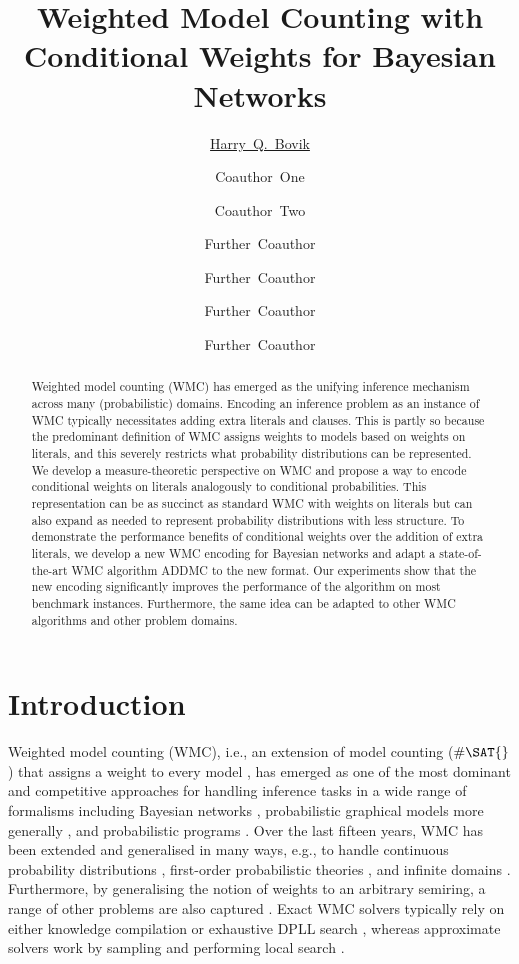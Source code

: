 \documentclass{uai2021} %
\title{Weighted Model Counting with Conditional Weights for Bayesian Networks}
\author[1]{\href{mailto:Harry Q. Bovik <harryq@example.edu>?Subject=Your UAI 2021 paper}{Harry~Q.~Bovik}{}} %
\author[2]{Coauthor~One}
\author[1,2]{Coauthor~Two}
\author[3]{Further~Coauthor}
\author[1]{Further~Coauthor}
\author[3]{Further~Coauthor}
\author[3,1]{Further~Coauthor}
\affil[1]{%
    Computer Science Dept.\\
    Cranberry University\\
    Pittsburgh, Pennsylvania, USA
}
\affil[2]{%
    Affiliation\\
    Address\\
    …
}
\affil[3]{…}
\theoremstyle{definition}
\begin{document}
\maketitle

\begin{abstract}
  Weighted model counting (WMC) has emerged as the unifying inference mechanism
  across many (probabilistic) domains. Encoding an inference problem as an
  instance of WMC typically necessitates adding extra literals and clauses. This
  is partly so because the predominant definition of WMC assigns weights to
  models based on weights on literals, and this severely restricts what
  probability distributions can be represented. We develop a measure-theoretic
  perspective on WMC and propose a way to encode conditional weights on literals
  analogously to conditional probabilities. This representation can be as
  succinct as standard WMC with weights on literals but can also expand as
  needed to represent probability distributions with less structure. To
  demonstrate the performance benefits of conditional weights over the addition
  of extra literals, we develop a new WMC encoding for Bayesian networks and
  adapt a state-of-the-art WMC algorithm \textsf{ADDMC} to the new format. Our
  experiments show that the new encoding significantly improves the performance
  of the algorithm on most benchmark instances. Furthermore, the same idea can
  be adapted to other WMC algorithms and other problem domains.
\end{abstract}

\section{Introduction}

Weighted model counting (WMC), i.e., an extension of model counting ($\#\SAT{}$)
that assigns a weight to every model \citep{DBLP:conf/aaai/SangBK05}, has
emerged as one of the most dominant and competitive approaches for handling
inference tasks in a wide range of formalisms including Bayesian networks
\citep{DBLP:conf/aaai/SangBK05,DBLP:books/daglib/0024906}, probabilistic
graphical models more generally \citep{DBLP:conf/ecsqaru/ChoiKD13}, and
probabilistic programs
\citep{DBLP:journals/tplp/FierensBRSGTJR15,DBLP:journals/corr/abs-2005-09089}.
Over the last fifteen years, WMC has been extended and generalised in many ways,
e.g., to handle continuous probability distributions
\citep{DBLP:conf/ijcai/BellePB15}, first-order probabilistic theories
\citep{DBLP:conf/ijcai/BroeckTMDR11,DBLP:journals/cacm/GogateD16}, and infinite
domains \citep{DBLP:conf/aaai/Belle17}. Furthermore, by generalising the notion
of weights to an arbitrary semiring, a range of other problems are also captured
\citep{DBLP:journals/japll/KimmigBR17}. Exact WMC solvers typically rely on
either knowledge compilation
\citep{DBLP:conf/ijcai/OztokD15,DBLP:conf/ijcai/LagniezM17} or exhaustive DPLL
search \citep{DBLP:conf/aaai/SangBK05}, whereas approximate solvers work by
sampling \citep{DBLP:conf/aaai/ChakrabortyFMSV14} and performing local search
\citep{DBLP:conf/sat/WeiS05}.
\end{document}
